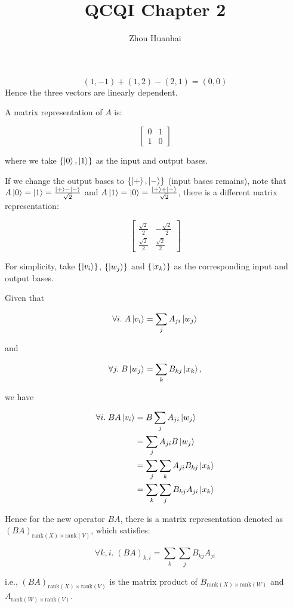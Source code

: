 \documentclass{homeworg}
\title{QCQI Chapter 2}
\author{Zhou Huanhai}
\begin{document}
\maketitle

\exercise*
\[(1,-1)+(1,2)-(2,1)=(0,0)\]
Hence the three vectors are linearly dependent.

\exercise*
A matrix representation of $A$ is:

\[\begin{bmatrix} 0 & 1 \\ 1 & 0 \end{bmatrix}\]

where we take $\{\ket{0},\ket{1}\}$ as the input and output bases.

If we change the output bases to $\{\ket{+},\ket{-}\}$ (input bases remains), note that $A\ket{0}=\ket{1}=\frac{\ket{+}-\ket{-}}{\sqrt{2}}$ and $A\ket{1}=\ket{0}=\frac{\ket{+}+\ket{-}}{\sqrt{2}}$, there is a different matrix representation:

\[\begin{bmatrix} \frac{\sqrt{2}}{2} & -\frac{\sqrt{2}}{2} \\ \frac{\sqrt{2}}{2} & \frac{\sqrt{2}}{2} \end{bmatrix}\]

\exercise*
For simplicity, take $\{\ket{v_i}\}$, $\{\ket{w_j}\}$ and $\{\ket{x_k}\}$ as the corresponding input and output bases.

Given that 

\[\forall i.\; A\ket{v_i}=\sum_{j}A_{ji}\ket{w_j}\]

and

\[\forall j.\; B\ket{w_j}=\sum_{k}B_{kj}\ket{x_k},\]

we have

\begin{align}
    \forall i.\; BA\ket{v_i}&=B\sum_{j}A_{ji}\ket{w_j}\nonumber\\
    &=\sum_{j}A_{ji}B\ket{w_j}\nonumber\\
    &=\sum_{j}\sum_{k}A_{ji}B_{kj}\ket{x_k}\nonumber\\
    &=\sum_{k}\sum_{j}B_{kj}A_{ji}\ket{x_k}\nonumber
\end{align}

Hence for the new operator $BA$, there is a matrix representation denoted as $(BA)_{\mathrm{rank}(X)\times \mathrm{rank}(V)}$, which satisfies:

\[\forall{k,i}.\; (BA)_{k,i}=\sum_{k}\sum_{j}B_{kj}A_{ji}\]

i.e., $(BA)_{\mathrm{rank}(X)\times \mathrm{rank}(V)}$ is the matrix product of $B_{\mathrm{rank}(X)\times \mathrm{rank}(W)}$ and $A_{\mathrm{rank}(W)\times \mathrm{rank}(V)}$.
\end{document}
